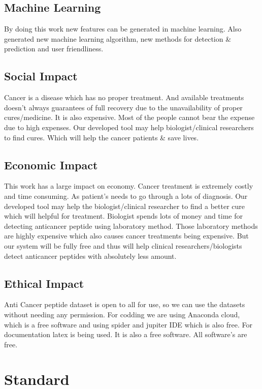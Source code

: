 \subsection{Machine Learning}

By doing this work new features can be generated in machine learning. Also generated new machine learning algorithm, new methods for detection \& prediction and user friendliness.

\subsection{Social Impact}
Cancer is a disease which has no proper treatment. And available treatments doesn't always guarantees of full recovery due to the unavailability of proper cures/medicine. It is also expensive. Most of the people cannot bear the expense due to high expenses. Our developed tool may help biologist/clinical researchers to find cures. Which will help the cancer patients \& save lives. 

\subsection{Economic Impact}

This work has a large impact on economy. Cancer treatment is extremely costly and time consuming. As patient's needs to go through a lots of diagnosis. Our developed tool may help the biologist/clinical researcher to find a better cure which will helpful for treatment. Biologist spends lots of money and time for detecting anticancer peptide using laboratory method. Those laboratory methods are highly expensive which also causes cancer treatments being expensive. But our system will be fully free and thus will help clinical researchers/biologists detect anticancer peptides with absolutely less amount.

\subsection{Ethical Impact}
Anti Cancer peptide dataset is open to all for use, so we can use the datasets without needing any permission. For codding we are using Anaconda cloud, which is a free software and using spider and jupiter IDE which is also free. For documentation latex is being used. It is also a free software. All software's are free.

\section{Standard}

